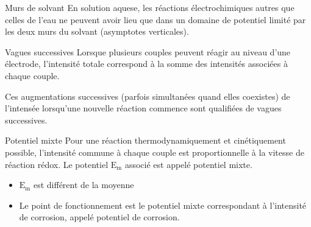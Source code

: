 \documentclass[french, a4paper, 11pt, twocolumn]{article}
\begin{document}
    \begin{cadre}{Murs de solvant}
        En solution aquese, les réactions électrochimiques autres que celles de l'eau ne peuvent avoir lieu que dans un
        domaine de potentiel limité par les deux murs du solvant (asymptotes verticales).
    \end{cadre}

    \begin{cadre}{Vagues successives}
        Lorsque plusieurs couples peuvent réagir au niveau d'une électrode, l'intensité totale correspond à la somme des 
        intensités associées à chaque couple. 
        
        Ces augmentations successives (parfois simultanées quand elles coexistes)
        de l'intensée lorsqu'une nouvelle réaction commence sont qualifiées de vagues successives.
    \end{cadre}

    \begin{cadre}{Potentiel mixte}
        Pour une réaction thermodynamiquement et cinétiquement possible,
        l'intensité commune à chaque couple est proportionnelle à la vitesse de 
        réaction rédox. Le potentiel \(\mathrm{E_m}\) associé est appelé potentiel mixte.
        

        \tcblower
        \begin{itemize}
            \item \(\mathrm{E_m}\) est différent de la moyenne
            \item Le point de fonctionnement est le potentiel mixte correspondant à l'intensité de corrosion,
                appelé potentiel de corrosion.
        \end{itemize}
        
    \end{cadre}
\end{document}
